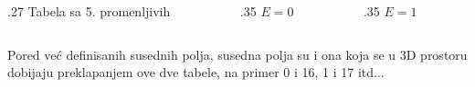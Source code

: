 \begin{frame}[label=02-s037]
\begin{columns}[c,onlytextwidth]
\begin{column}{.27\textwidth}
Tabela sa 5. promenljivih
\end{column}
\begin{column}{.35\textwidth}\centering
\(E=0\)\par

\end{column}
\begin{column}{.35\textwidth}\centering
\(E=1\)\par

\end{column}
\end{columns}

Pored već definisanih susednih polja, susedna polja su i ona koja se u 3D prostoru dobijaju preklapanjem ove dve tabele, na primer 0 i 16, 1 i 17 itd...
\end{frame}
